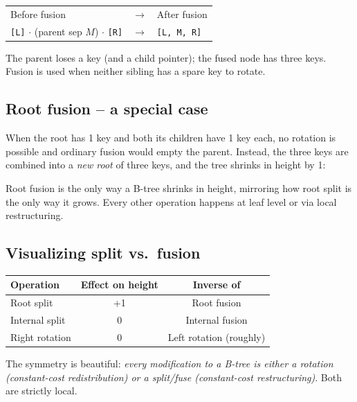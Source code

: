 \documentclass[11pt]{article}
\begin{document}
\begin{center}
\begin{tabular}{lll}
Before fusion & $\to$ & After fusion \\
\texttt{[L]} $\cdot$ (parent sep $M$) $\cdot$ \texttt{[R]} & $\to$ & \texttt{[L, M, R]} \\
\end{tabular}
\end{center}

The parent loses a key (and a child pointer); the fused node has three keys. Fusion is used when neither sibling has a spare key to rotate.

\subsection*{Root fusion -- a special case}

When the root has 1 key and both its children have 1 key each, no rotation is possible and ordinary fusion would empty the parent. Instead, the three keys are combined into a \emph{new root} of three keys, and the tree shrinks in height by 1:

\begin{ideabox}
Root fusion is the only way a B-tree shrinks in height, mirroring how root split is the only way it grows. Every other operation happens at leaf level or via local restructuring.
\end{ideabox}

\subsection*{Visualizing split vs.\ fusion}

\begin{center}
\begin{tabular}{lcc}
\hline
Operation & Effect on height & Inverse of \\
\hline
Root split & +1 & Root fusion \\
Internal split & 0 & Internal fusion \\
Right rotation & 0 & Left rotation (roughly) \\
\hline
\end{tabular}
\end{center}

The symmetry is beautiful: \emph{every modification to a B-tree is either a rotation (constant-cost redistribution) or a split/fuse (constant-cost restructuring)}. Both are strictly local.
\end{document}
